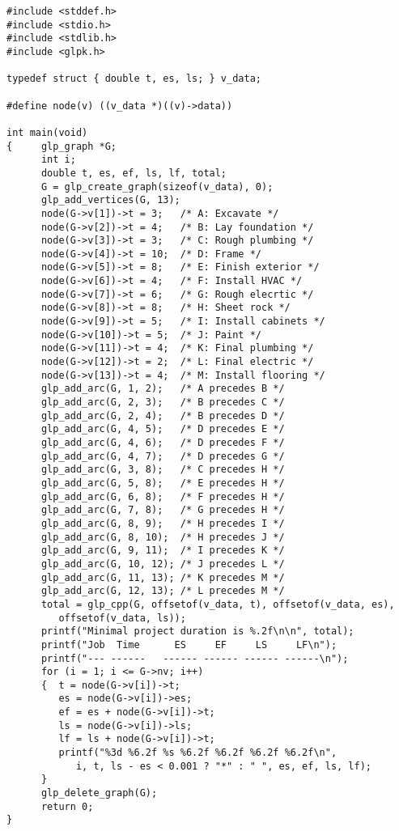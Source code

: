 \documentclass[11pt]{report}
\begin{document}
\begin{footnotesize}
\begin{verbatim}
#include <stddef.h>
#include <stdio.h>
#include <stdlib.h>
#include <glpk.h>

typedef struct { double t, es, ls; } v_data;

#define node(v) ((v_data *)((v)->data))

int main(void)
{     glp_graph *G;
      int i;
      double t, es, ef, ls, lf, total;
      G = glp_create_graph(sizeof(v_data), 0);
      glp_add_vertices(G, 13);
      node(G->v[1])->t = 3;   /* A: Excavate */
      node(G->v[2])->t = 4;   /* B: Lay foundation */
      node(G->v[3])->t = 3;   /* C: Rough plumbing */
      node(G->v[4])->t = 10;  /* D: Frame */
      node(G->v[5])->t = 8;   /* E: Finish exterior */
      node(G->v[6])->t = 4;   /* F: Install HVAC */
      node(G->v[7])->t = 6;   /* G: Rough elecrtic */
      node(G->v[8])->t = 8;   /* H: Sheet rock */
      node(G->v[9])->t = 5;   /* I: Install cabinets */
      node(G->v[10])->t = 5;  /* J: Paint */
      node(G->v[11])->t = 4;  /* K: Final plumbing */
      node(G->v[12])->t = 2;  /* L: Final electric */
      node(G->v[13])->t = 4;  /* M: Install flooring */
      glp_add_arc(G, 1, 2);   /* A precedes B */
      glp_add_arc(G, 2, 3);   /* B precedes C */
      glp_add_arc(G, 2, 4);   /* B precedes D */
      glp_add_arc(G, 4, 5);   /* D precedes E */
      glp_add_arc(G, 4, 6);   /* D precedes F */
      glp_add_arc(G, 4, 7);   /* D precedes G */
      glp_add_arc(G, 3, 8);   /* C precedes H */
      glp_add_arc(G, 5, 8);   /* E precedes H */
      glp_add_arc(G, 6, 8);   /* F precedes H */
      glp_add_arc(G, 7, 8);   /* G precedes H */
      glp_add_arc(G, 8, 9);   /* H precedes I */
      glp_add_arc(G, 8, 10);  /* H precedes J */
      glp_add_arc(G, 9, 11);  /* I precedes K */
      glp_add_arc(G, 10, 12); /* J precedes L */
      glp_add_arc(G, 11, 13); /* K precedes M */
      glp_add_arc(G, 12, 13); /* L precedes M */
      total = glp_cpp(G, offsetof(v_data, t), offsetof(v_data, es),
         offsetof(v_data, ls));
      printf("Minimal project duration is %.2f\n\n", total);
      printf("Job  Time      ES     EF     LS     LF\n");
      printf("--- ------   ------ ------ ------ ------\n");
      for (i = 1; i <= G->nv; i++)
      {  t = node(G->v[i])->t;
         es = node(G->v[i])->es;
         ef = es + node(G->v[i])->t;
         ls = node(G->v[i])->ls;
         lf = ls + node(G->v[i])->t;
         printf("%3d %6.2f %s %6.2f %6.2f %6.2f %6.2f\n",
            i, t, ls - es < 0.001 ? "*" : " ", es, ef, ls, lf);
      }
      glp_delete_graph(G);
      return 0;
}
\end{verbatim}
\end{footnotesize}
\end{document}
